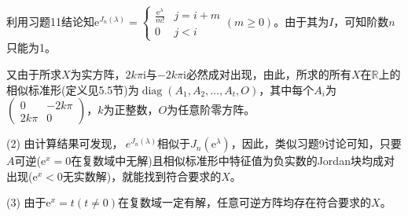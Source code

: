 \documentclass[a4paper,UTF8,fontset=windows]{ctexart}
\DeclareMathOperator{\diag}{diag}
\begin{document}
\begin{enumerate}
利用习题11结论知$\mathrm{e}^{J_n(\lambda)}=\begin{cases}\frac{\mathrm{e}^\lambda}{m!}&j=i+m\\0&j<i\end{cases}(m\ge0)$。由于其为$I$，可知阶数$n$只能为1。

又由于所求$X$为实方阵，$2k\pi\mathrm{i}$与$-2k\pi\mathrm{i}$必然成对出现，由此，所求的所有$X$在$\mathbb{R}$上的相似标准形(定义见5.5节)为$\diag(A_1,A_2,\dots,A_t,O)$，其中每个$A_i$为$\begin{pmatrix}0&-2k\pi\\2k\pi&0\end{pmatrix}$，$k$为正整数，$O$为任意阶零方阵。

(2) 由计算结果可发现，$\ e^{J_n(\lambda)}$相似于$J_n(\mathrm{e}^\lambda)$，因此，类似习题9讨论可知，只要$A$可逆($\mathrm{e}^x=0$在复数域中无解)且相似标准形中特征值为负实数的Jordan块均成对出现($\mathrm{e}^x<0$无实数解)，就能找到符合要求的$X$。

(3) 由于$\mathrm{e}^x=t(t\ne0)$在复数域一定有解，任意可逆方阵均存在符合要求的$X$。
\end{enumerate}
\end{document}
